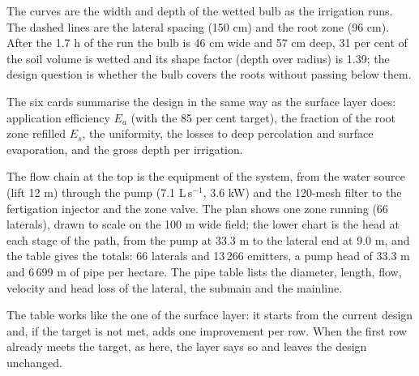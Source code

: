
The curves are the width and depth of the wetted bulb as the irrigation runs. The dashed lines are the lateral spacing (150 cm) and the root zone (96 cm). After the 1.7 h of the run the bulb is 46 cm wide and 57 cm deep, 31 per cent of the soil volume is wetted and its shape factor (depth over radius) is 1.39; the design question is whether the bulb covers the roots without passing below them.


The six cards summarise the design in the same way as the surface layer does: application efficiency $E_a$ (with the 85 per cent target), the fraction of the root zone refilled $E_s$, the uniformity, the losses to deep percolation and surface evaporation, and the gross depth per irrigation.


The flow chain at the top is the equipment of the system, from the water source (lift 12 m) through the pump (7.1 L\,s$^{-1}$, 3.6 kW) and the 120-mesh filter to the fertigation injector and the zone valve. The plan shows one zone running (66 laterals), drawn to scale on the 100 m wide field; the lower chart is the head at each stage of the path, from the pump at 33.3 m to the lateral end at 9.0 m, and the table gives the totals: 66 laterals and 13\,266 emitters, a pump head of 33.3 m and 6\,699 m of pipe per hectare. The pipe table lists the diameter, length, flow, velocity and head loss of the lateral, the submain and the mainline.


The table works like the one of the surface layer: it starts from the current design and, if the target is not met, adds one improvement per row. When the first row already meets the target, as here, the layer says so and leaves the design unchanged.

